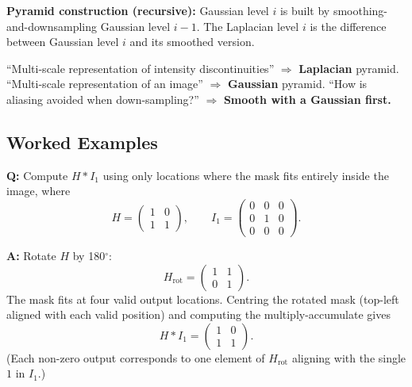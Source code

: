 \textbf{Pyramid construction (recursive):} Gaussian level $i$ is built by smoothing-and-downsampling Gaussian level $i-1$. The Laplacian level $i$ is the difference between Gaussian level $i$ and its smoothed version.

\begin{tipbox}
``Multi-scale representation of intensity discontinuities'' $\Rightarrow$ \textbf{Laplacian} pyramid.
``Multi-scale representation of an image'' $\Rightarrow$ \textbf{Gaussian} pyramid.
``How is aliasing avoided when down-sampling?'' $\Rightarrow$ \textbf{Smooth with a Gaussian first.}
\end{tipbox}

\bigseparator

\subsection{Worked Examples}

\begin{exbox}
\textbf{Q:} Compute $H \ast I_1$ using only locations where the mask fits entirely inside the image, where
\[
H = \begin{pmatrix} 1 & 0 \\ 1 & 1 \end{pmatrix}, \qquad I_1 = \begin{pmatrix} 0 & 0 & 0 \\ 0 & 1 & 0 \\ 0 & 0 & 0 \end{pmatrix}.
\]

\textbf{A:} Rotate $H$ by 180$^\circ$:
\[
H_{\text{rot}} = \begin{pmatrix} 1 & 1 \\ 0 & 1 \end{pmatrix}.
\]
The mask fits at four valid output locations. Centring the rotated mask (top-left aligned with each valid position) and computing the multiply-accumulate gives
\[
H \ast I_1 = \begin{pmatrix} 1 & 0 \\ 1 & 1 \end{pmatrix}.
\]
(Each non-zero output corresponds to one element of $H_{\text{rot}}$ aligning with the single $1$ in $I_1$.)
\end{exbox}

